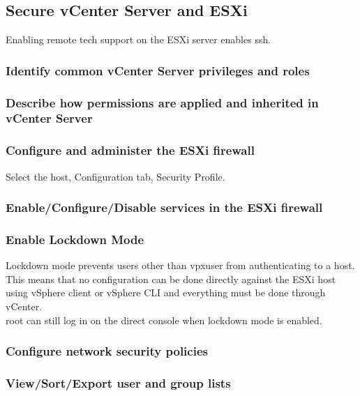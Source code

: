 \subsection{Secure vCenter Server and ESXi}

Enabling remote tech support on the ESXi server enables ssh.

\subsubsection{Identify common vCenter Server privileges and roles}

\subsubsection{Describe how permissions are applied and inherited in vCenter Server}

\subsubsection{Configure and administer the ESXi firewall}

Select the host, Configuration tab, Security Profile.

\subsubsection{Enable/Configure/Disable services in the ESXi firewall}

\subsubsection{Enable Lockdown Mode}

Lockdown mode prevents users other than vpxuser from authenticating to a host.
This means that no configuration can be done directly against the ESXi host
using vSphere client or vSphere CLI and everything must be done through
vCenter.\\

root can still log in on the direct console when lockdown mode is enabled.

\subsubsection{Configure network security policies}

\subsubsection{View/Sort/Export user and group lists}

